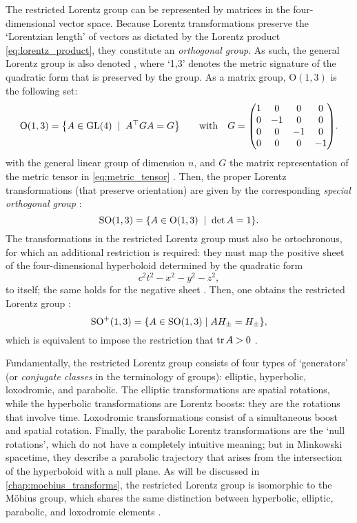 The restricted Lorentz group can be represented by matrices in the four-dimensional vector space. Because Lorentz transformations preserve the `Lorentzian length' of vectors as dictated by the Lorentz product \cref{eq:lorentz_product}, they constitute an \emph{orthogonal group}. As such, the general Lorentz group is also denoted , where `1,3' denotes the metric signature of the quadratic form that is preserved by the group. As a matrix group, $\text{O}(1,3)$ is the following set:
$$ 
    \text{O}(1, 3) = \qty{A \in \text{GL}(4)\;\mid\;A^\top G A = G} \qquad \text{with}\quad G = \mqty(\dmat[0]{1,-1,-1,-1}). 
$$
with  the general linear group of dimension $n$, and $G$ the matrix representation of the metric tensor in \cref{eq:metric_tensor} \cite{Baker1967}. Then, the proper Lorentz transformations (that preserve orientation) are given by the corresponding \emph{special orthogonal group} :
$$ \text{SO}(1, 3) = \qty{A \in \text{O}(1, 3)\;\mid\;\det A = 1}.$$
The transformations in the restricted Lorentz group must also be ortochronous, for which an additional restriction is required: they must map the positive sheet  of the four-dimensional hyperboloid determined by the quadratic form 
$$ c^2t^2 - x^2 - y^2 - z^2, $$
to itself; the same holds for the negative sheet . Then, one obtains the restricted Lorentz group :
$$ \text{SO}^+(1, 3) = \qty{A \in \text{SO}(1, 3) \mid AH_{\pm} = H_{\pm}}, $$
which is equivalent to impose the restriction that $\trace A > 0$ \cite{Balazs1986, Baker1967}.

Fundamentally, the restricted Lorentz group consists of four types of `generators' (or \emph{conjugate classes} in the terminology of groups): elliptic, hyperbolic, loxodromic, and parabolic. The elliptic transformations are spatial rotations, while the hyperbolic transformations are Lorentz boosts: they are the rotations that involve time. Loxodromic transformations consist of a simultaneous boost and spatial rotation. Finally, the parabolic Lorentz transformations are the `null rotations', which do not have a completely intuitive meaning; but in Minkowski spacetime, they describe a parabolic trajectory that arises from the intersection of the hyperboloid with a null plane. As will be discussed in \cref{chap:moebius_transforms}, the restricted Lorentz group is isomorphic to the Möbius group, which shares the same distinction between hyperbolic, elliptic, parabolic, and loxodromic elements \cite{Needham2021}.

